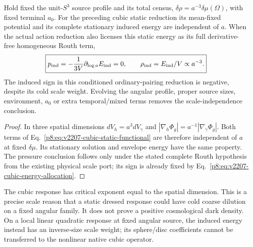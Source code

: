\documentclass[12pt,a4paper]{article}
\begin{document}
\begin{theorem}
\label{p8:thm:v2207-cubic-scale-weight}
Hold fixed the unit-$S^3$ source profile and its total census,
$\delta\rho=a^{-3}\delta\mu(\Omega)$, with fixed terminal $a_0$.
For the preceding cubic static reduction its mean-fixed potential and
its complete stationary induced energy are independent of $a$.
When the actual action reduction also licenses this
static energy as its full derivative-free homogeneous Routh term,
\[
 \boxed{p_{\rm ind}=-\frac1{3V}\partial_{\log a}E_{\rm ind}=0,
 \qquad \rho_{\rm ind}=E_{\rm ind}/V\propto a^{-3}.}
\]
The induced sign in this conditioned ordinary-pairing reduction is
negative, despite its cold scale weight. Evolving the angular profile,
proper source sizes, environment, $a_0$ or extra temporal/mixed terms
removes the scale-independence conclusion.
\end{theorem}
\begin{proof}
In three spatial dimensions $dV_h=a^3dV_\gamma$ and
$|\nabla_h\Phi_g|=a^{-1}|\nabla_\gamma\Phi_g|$.
Both terms of Eq.~\eqref{p8:eq:v2207-cubic-static-functional} are therefore
independent of $a$ at fixed $\delta\mu$. Its stationary solution and
envelope energy have the same property. The pressure conclusion follows
only under the stated complete Routh hypothesis from the existing
physical scale port; its sign is already fixed by
Eq.~\eqref{p8:eq:v2207-cubic-energy-allocation}.
\end{proof}

The cubic response has critical exponent equal to the spatial dimension.
This is a precise scale reason that a static dressed response could have
cold coarse dilution on a fixed angular family. It does not prove a
positive cosmological dark density. On a local linear quadratic response
at fixed angular source, the induced energy instead has an inverse-size
scale weight; its sphere/disc coefficients cannot be transferred to the
nonlinear native cubic operator.

\end{document}
